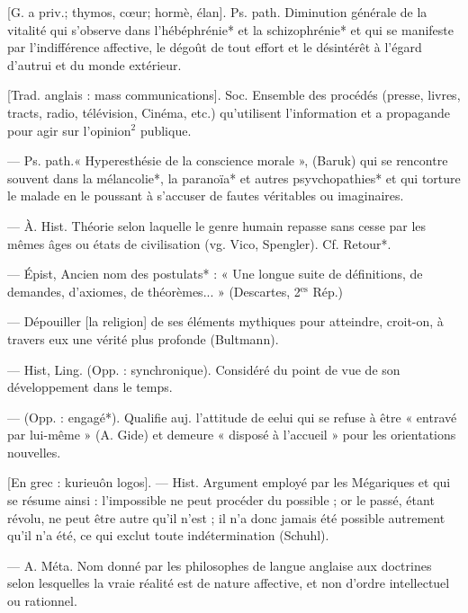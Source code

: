 	\begin{itemize}[leftmargin=1cm, label=, itemsep=1pt]

 [G. a priv.; thymos,
cœur; hormè, élan]. Ps. path.
Diminution générale de la vitalité
qui s’observe dans l'hébéphrénie*
et la schizophrénie* et qui se manifeste par l'indifférence affective,
le dégoût de tout effort et le désintérêt à l'égard d'autrui et du
monde extérieur.

 [Trad.
anglais : mass communications].
Soc. Ensemble des procédés
(presse, livres, tracts, radio, télévision, Cinéma, etc.) qu'utilisent
l'information et a propagande
pour agir sur l'opinion$^2$ publique.

 — Ps.
path.« Hyperesthésie de la conscience
morale », (Baruk) qui se rencontre
souvent dans la mélancolie*, la
paranoïa* et autres psyvchopathies*
et qui torture le malade en le poussant à s’accuser de fautes véritables
ou imaginaires.

 — À. Hist.
Théorie selon laquelle le genre
humain repasse sans cesse par les
mêmes âges ou états de civilisation
(vg. Vico, Spengler). Cf. Retour*.

 — Épist, Ancien nom des
postulats* : « Une longue suite de
définitions, de demandes, d’axiomes, de théorèmes... » (Descartes,
2$^\text{es}$ Rép.)

 — Dépouiller [la
religion] de ses éléments mythiques
pour atteindre, croit-on, à travers
eux une vérité plus profonde (Bultmann).

 — Hist, Ling. (Opp. :
synchronique). Considéré du point
de vue de son développement
dans le temps.

 — (Opp. : engagé*).
Qualifie auj. l'attitude de eelui
qui se refuse à être « entravé par
lui-même » (A. Gide) et demeure
« disposé à l'accueil » pour les
orientations nouvelles.

 [En grec :
kurieuôn logos]. — Hist. Argument
employé par les Mégariques et qui
se résume ainsi : l’impossible ne
peut procéder du possible ; or le
passé, étant révolu, ne peut être
autre qu’il n’est ; il n’a donc jamais
été possible autrement qu'il n'a
été, ce qui exclut toute indétermination (Schuhl).

 — A. Méta. Nom donné
par les philosophes de langue anglaise aux doctrines selon lesquelles la vraie réalité est de
nature affective, et non d'ordre
intellectuel ou rationnel.


\end{itemize}
